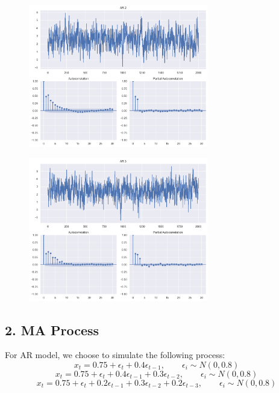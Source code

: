 \documentclass[11pt,en]{elegantpaper}
\begin{document}
\begin{figure}[htbp] 
    \centering 
    \includegraphics[width=0.7\textwidth]{./image/AR2} 
\end{figure}
\begin{figure}[htbp] 
    \centering 
    \includegraphics[width=0.7\textwidth]{./image/AR3} 
\end{figure}

\subsection*{2. MA Process}


For AR model, we choose to simulate the following process:
\[x_t=0.75+\epsilon_t+0.4\epsilon_{t-1}, \qquad \epsilon_i \sim N(0,0.8)\]
\[x_t=0.75+\epsilon_t+0.4\epsilon_{t-1}+0.3\epsilon_{t-2}, \qquad \epsilon_i \sim N(0,0.8)\]
\[x_t=0.75+\epsilon_t+0.2\epsilon_{t-1}+0.3\epsilon_{t-2}+0.2\epsilon_{t-3}, \qquad \epsilon_i \sim N(0,0.8)\]
\end{document}
